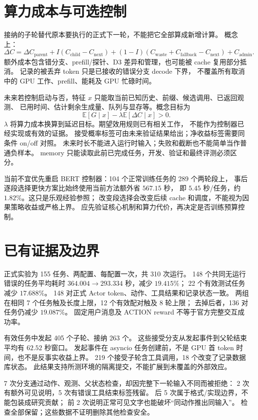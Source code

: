 \documentclass[UTF8,11pt]{ctexart}
\begin{document}
\section{算力成本与可选控制}
接纳的子轮替代原本要执行的正式下一轮，不能把它全部算成新增计算。
概念上：
\[
\Delta C=\Delta C_{\mathrm{parent}}
+I(C_{\mathrm{child}}-C_{\mathrm{next}})
+(1-I)(C_{\mathrm{waste}}+C_{\mathrm{fallback}}-C_{\mathrm{next}})
+C_{\mathrm{admin}}.
\]
额外成本包含错分支、prefill/探针、D3 差异和管理，也可能被 cache 复用部分抵消。
记录的被丢弃 token 只是已接收的错误分支 decode 下界，
不覆盖所有取消中的 GPU 工作、prefill、能耗及 GPU 忙碌时间。

未来若控制启动与否，特征 $x$ 只能取当前已知历史、前缀、候选调用、已返回观测、
已用时间、估计剩余生成量、队列与显存等。概念目标为
\[
\mathbb E[G\mid x]-\lambda\mathbb E[\Delta C\mid x]>0.
\]
$\lambda$ 将算力成本换算到延迟目标。期望效用规则已有相关工作，
不能作为控制器已经实现或有效的证据。
接受概率标签可由未来验证结果给出；净收益标签需要同条件 on/off 对照。
未来时长不能进入运行时输入；失败和截断也不能简单当作普通负样本。
memory 只能读取此前已完成任务，开发、验证和最终评测必须区分。

当前不宜优先重启 BERT 控制器：104 个正常训练任务的 289 个两轮段上，
事后逐段选择更快方案比始终使用当前方法额外省 $567.15$ 秒，
即 $5.45$ 秒/任务，约 $1.82\%$。这只是乐观经验参照；
改变段选择会改变后续 cache 和调度，不能视为因果策略收益或严格上界。
应先验证核心机制和算力代价，再决定是否训练预算控制。

\section{已有证据及边界}
正式实验为 155 任务、两配置、每配置一次，共 310 次运行。
148 个共同无运行错误的任务平均耗时 $364.004\to293.334$ 秒，减少 $19.415\%$；
22 个有效测试任务减少 $17.688\%$。
148 对正式 Actor token、动作、工具结果和记录状态一致。
两组在相同 7 个任务触及长度上限，12 个有效配对触及 8 轮上限；
去掉后者，136 对任务仍减少 $19.087\%$。
固定用户消息及 ACTION reward 不等于官方完整交互成功率。

有效任务中发起 405 个子轮、接纳 263 个。
这些接受分支从发起事件到父轮结束平均有 $62.52$ 秒窗口。
发起事件在 asyncio 任务创建前，不是 GPU 首 token 时间，也不是反事实收益上界。
219 个接受子轮含工具调用，18 个改变了记录数据库状态。
此结果支持所测环境的隔离提交，不能扩展到未覆盖的外部效应。

7 次分支通过动作、观测、父状态检查，却因完整下一轮输入不同而被拒绝：
2 次有额外可见说明，5 次有错误工具结束标签残留。
后 5 次属于格式/实现边界，不能包装成研究贡献；
前 2 次说明正常可见文字也能破坏“同动作推出同输入”。
检查全部保留；这些数据不证明删除其他检查安全。
\end{document}

